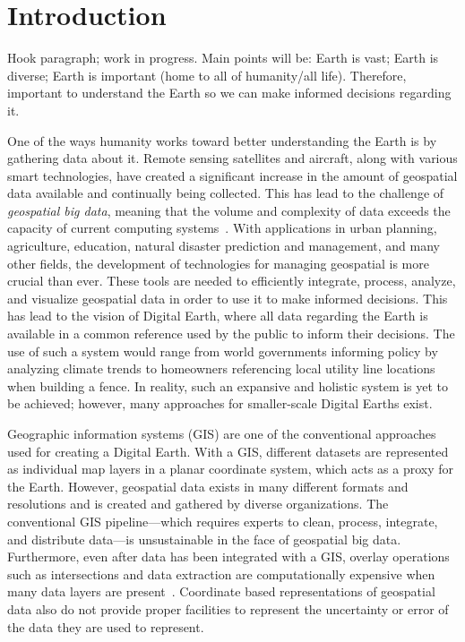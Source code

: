 \chapter{Introduction} \label{chap:introduction}
Hook paragraph; work in progress.
Main points will be:
Earth is vast;
Earth is diverse;
Earth is important (home to all of humanity/all life).
Therefore, important to understand the Earth so we can make informed decisions regarding it.



One of the ways humanity works toward better understanding the Earth is by gathering data about it.
Remote sensing satellites and aircraft, along with various smart technologies, have created a significant increase in the amount of geospatial data available and continually being collected.
This has lead to the challenge of \textit{geospatial big data}, meaning that the volume and complexity of data exceeds the capacity of current computing systems~\cite{lee2015geospatial}.
With applications in urban planning, agriculture, education, natural disaster prediction and management, and many other fields, the development of technologies for managing geospatial is more crucial than ever.
These tools are needed to efficiently integrate, process, analyze, and visualize geospatial data in order to use it to make informed decisions.
This has lead to the vision of Digital Earth, where all data regarding the Earth is available in a common reference used by the public to inform their decisions.
The use of such a system would range from world governments informing policy by analyzing climate trends to homeowners referencing local utility line locations when building a fence.
In reality, such an expansive and holistic system is yet to be achieved; however, many approaches for smaller-scale Digital Earths exist.


Geographic information systems (GIS) are one of the conventional approaches used for creating a Digital Earth.
With a GIS, different datasets are represented as individual map layers in a planar coordinate system, which acts as a proxy for the Earth.
However, geospatial data exists in many different formats and resolutions and is created and gathered by diverse organizations.
The conventional GIS pipeline---which requires experts to clean, process, integrate, and distribute data---is unsustainable in the face of geospatial big data.
Furthermore, even after data has been integrated with a GIS, overlay operations such as intersections and data extraction are computationally expensive when many data layers are present~\cite{wang2015improving}.
Coordinate based representations of geospatial data also do not provide proper facilities to represent the uncertainty or error of the data they are used to represent.



